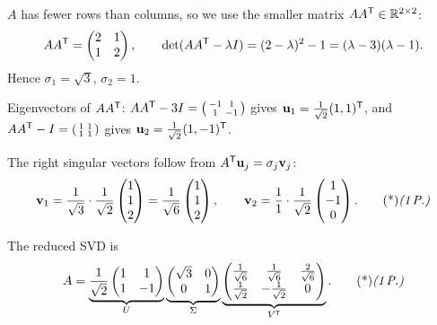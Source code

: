 \begin{solution}
 $A$ has fewer rows than columns, so we use the smaller matrix $AA^{\mathsf{T}}\in\mathbb{R}^{2\times2}$:
\[
AA^{\mathsf{T}}=\begin{pmatrix}2&1\\1&2\end{pmatrix},\qquad \det(AA^{\mathsf{T}}-\lambda I)=(2-\lambda)^2-1=(\lambda-3)(\lambda-1).
\]
Hence $\sigma_1=\sqrt3$, $\sigma_2=1$. 

Eigenvectors of $AA^{\mathsf{T}}$: $AA^{\mathsf{T}}-3I=\begin{psmallmatrix}-1&1\\1&-1\end{psmallmatrix}$ gives $\mathbf{u}_1=\frac1{\sqrt2}(1,1)^{\mathsf{T}}$, and $AA^{\mathsf{T}}-I=\begin{psmallmatrix}1&1\\1&1\end{psmallmatrix}$ gives $\mathbf{u}_2=\frac1{\sqrt2}(1,-1)^{\mathsf{T}}$. 

The right singular vectors follow from $A^{\mathsf{T}}\mathbf{u}_j=\sigma_j\mathbf{v}_j$:
\[
\vb v_1=\frac{1}{\sqrt3}\cdot\frac{1}{\sqrt2}\begin{pmatrix}1\\1\\2\end{pmatrix}=\frac1{\sqrt6}\begin{pmatrix}1\\1\\2\end{pmatrix},\qquad
\vb v_2=\frac{1}{1}\cdot\frac{1}{\sqrt2}\begin{pmatrix}1\\-1\\0\end{pmatrix}.\ptd{1}
\]

The reduced SVD is
\[
A=\underbrace{\frac1{\sqrt2}\begin{pmatrix}1&1\\1&-1\end{pmatrix}}_{U}
\underbrace{\begin{pmatrix}\sqrt3&0\\0&1\end{pmatrix}}_{\Sigma}
\underbrace{\begin{pmatrix}\frac1{\sqrt6}&\frac1{\sqrt6}&\frac2{\sqrt6}\\[2pt]\frac1{\sqrt2}&-\frac1{\sqrt2}&0\end{pmatrix}}_{V\T}.\ptd{1}
\]


\end{solution}

